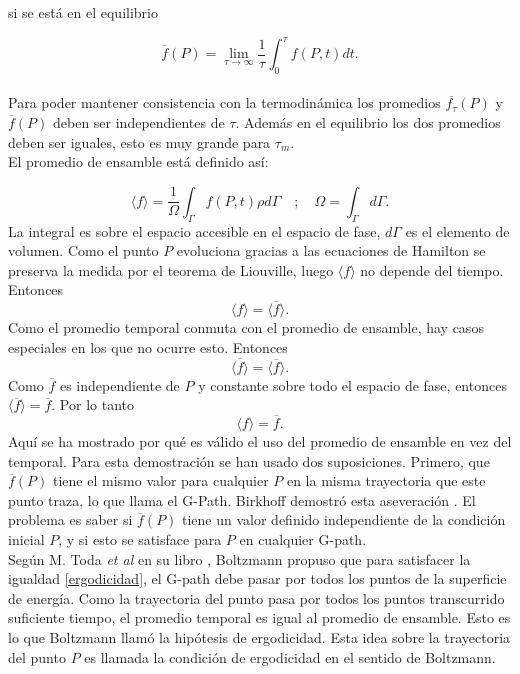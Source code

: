 si se está en el equilibrio

\begin{equation}
\overline{f}(P)= \lim_{\tau \to \infty} \frac{1}{\tau} \int_{0}^{\tau} f(P,t) dt.
\end{equation}
\\
Para poder mantener consistencia con la termodinámica los promedios $\overline{f_{\tau}}(P)$ y  $\overline{f}(P)$ deben ser independientes de $\tau$. Además en el equilibrio los dos promedios deben ser iguales, esto es muy grande para $\tau_{m}$. \\
El promedio de ensamble está definido así:

\begin{equation}
\langle f \rangle = \frac{1}{\Omega} \int_{\Gamma} f(P,t) \rho d\Gamma \quad ; \quad \Omega= \int_{\Gamma} d\Gamma.
\end{equation}
La integral es sobre el espacio accesible en el espacio de fase, $d\Gamma$ es el elemento de volumen. Como el punto $P$ evoluciona gracias a las ecuaciones de Hamilton se preserva la medida por el teorema de Liouville, luego $\langle f \rangle$ no depende del tiempo. Entonces 
\begin{equation}
\langle f \rangle =  \overline{\langle f \rangle}.
\end{equation}
Como el promedio temporal conmuta con el promedio de ensamble, hay casos especiales en los que no ocurre esto. Entonces
\begin{equation}
\overline{\langle f \rangle} = \langle \overline{f} \rangle.
\end{equation}
Como $\overline{f}$ es independiente de $P$ y constante sobre todo el espacio de fase, entonces $\langle \overline{f} \rangle= \overline{f}$. Por lo tanto
\begin{equation} \label{ergodicidad}
\langle f \rangle = \overline{f}.
\end{equation}
Aquí se ha mostrado por qué es válido el uso del promedio de ensamble en vez del temporal. Para esta demostración se han usado dos suposiciones. Primero, que $\overline{f}(P)$ tiene el mismo valor para cualquier $P$ en la misma trayectoria que este punto traza, lo que \cite{Ehrenfest} llama el G-Path. Birkhoff demostró esta aseveración \cite{Birkhoff}. El problema es saber si $\overline{f}(P)$  tiene un valor definido independiente de la condición inicial $P$, y si esto se satisface para $P$ en cualquier G-path. \\
Según M. Toda \textit{et al} en su libro \cite{TodaStat}, Boltzmann propuso que para satisfacer la igualdad \ref{ergodicidad}, el G-path debe pasar por todos los puntos de la superficie de energía. Como la trayectoria del punto pasa por todos los puntos transcurrido suficiente tiempo, el promedio temporal es igual al promedio de ensamble. Esto es lo que Boltzmann llamó la hipótesis de ergodicidad. Esta idea sobre la trayectoria del punto $P$ es llamada la condición de ergodicidad en el sentido de Boltzmann.
